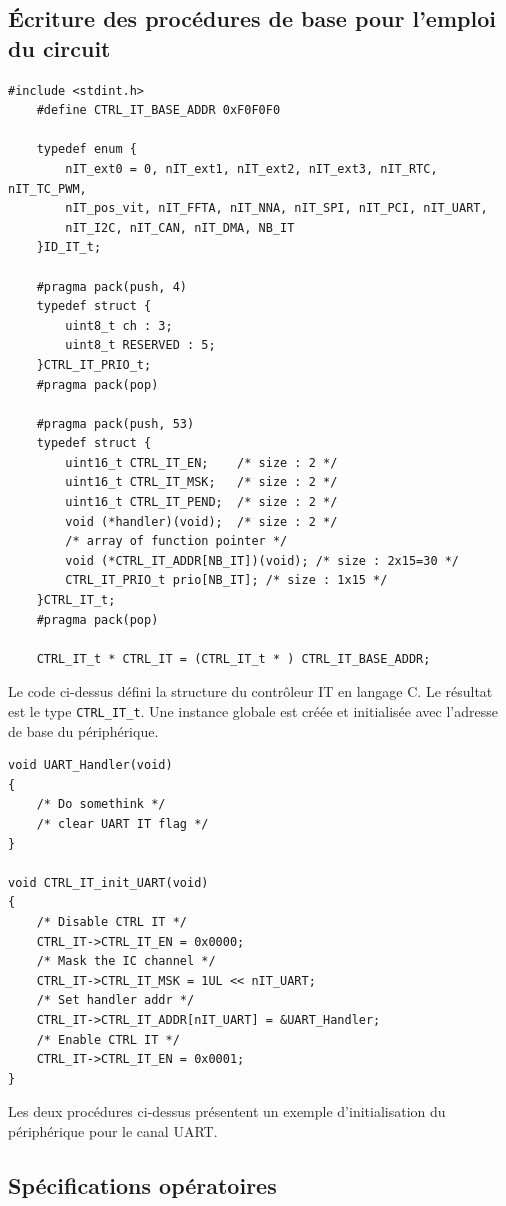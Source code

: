 \subsection{Écriture des procédures de base pour l'emploi du circuit}

\begin{lstlisting}[style=CStyle]
	#include <stdint.h>
	#define CTRL_IT_BASE_ADDR 0xF0F0F0
	
	typedef enum {
		nIT_ext0 = 0, nIT_ext1, nIT_ext2, nIT_ext3, nIT_RTC, nIT_TC_PWM,
		nIT_pos_vit, nIT_FFTA, nIT_NNA,	nIT_SPI, nIT_PCI, nIT_UART,
		nIT_I2C, nIT_CAN, nIT_DMA, NB_IT
	}ID_IT_t;
	
	#pragma pack(push, 4)
	typedef struct {
		uint8_t ch : 3;
		uint8_t RESERVED : 5;
	}CTRL_IT_PRIO_t;
	#pragma pack(pop)

	#pragma pack(push, 53)
	typedef struct {
		uint16_t CTRL_IT_EN;	/* size : 2 */
		uint16_t CTRL_IT_MSK;	/* size : 2 */
		uint16_t CTRL_IT_PEND;	/* size : 2 */
		void (*handler)(void);  /* size : 2 */
		/* array of function pointer */
		void (*CTRL_IT_ADDR[NB_IT])(void); /* size : 2x15=30 */
		CTRL_IT_PRIO_t prio[NB_IT];	/* size : 1x15 */
	}CTRL_IT_t;
	#pragma pack(pop)
	
	CTRL_IT_t * CTRL_IT = (CTRL_IT_t * ) CTRL_IT_BASE_ADDR;
\end{lstlisting}
Le code ci-dessus défini la structure du contrôleur IT en langage C. Le résultat est le type \texttt{CTRL\_IT\_t}. Une instance globale est créée et initialisée avec l'adresse de base du périphérique.

\begin{lstlisting}[style=CStyle]
void UART_Handler(void)
{
    /* Do somethink */
    /* clear UART IT flag */
}

void CTRL_IT_init_UART(void)
{
    /* Disable CTRL IT */
    CTRL_IT->CTRL_IT_EN = 0x0000;
    /* Mask the IC channel */
    CTRL_IT->CTRL_IT_MSK = 1UL << nIT_UART;
    /* Set handler addr */
    CTRL_IT->CTRL_IT_ADDR[nIT_UART] = &UART_Handler;
    /* Enable CTRL IT */
    CTRL_IT->CTRL_IT_EN = 0x0001;
}
\end{lstlisting}
Les deux procédures ci-dessus présentent un exemple d'initialisation du périphérique pour le canal UART.

\newpage

\subsection{Spécifications opératoires}

